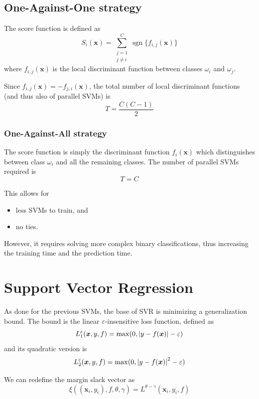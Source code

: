 \documentclass[oneside,onecolumn]{report}
\newcommand{\eps}{\varepsilon}
\DeclareMathOperator*{\sgn}{sgn}
\begin{document}
\subsection{One-Against-One strategy}
The score function is defined as
$$ S_i(\bm x) = \sum_{\substack{j = 1 \\ j \neq i}}^C \sgn\{f_{i, j}(\bm x)\} $$
where $f_{i, j}(\bm x)$ is the local discriminant function between classes $\omega_i$ and $\omega_j$.

Since $f_{i, j}(\bm x) = -f_{j, i}(\bm x)$, the total number of local discriminant functions (and thus also of parallel SVMs) is
$$ T = \frac{C (C - 1)}{2} $$

\subsubsection{One-Against-All strategy}
The score function is simply the discriminant function $f_i(\bm x)$ which distinguishes between class $\omega_i$ and all the remaining classes.
The number of parallel SVMs required is
$$ T = C $$

This allows for
\begin{itemize}
    \item less SVMs to train, and
    \item no ties.
\end{itemize}

However, it requires solving more complex binary classifications, thus increasing the training time and the prediction time.


\section{Support Vector Regression}
As done for the previous SVMs, the base of SVR is minimizing a generalization bound.
The bound is the linear $\eps$-insensitive loss function, defined as
$$ L_1^\eps(\bm x, y, f) = \max(0, \abs{y - f(\bm x)} - \eps) $$
and its quadratic version is
$$ L_2^\eps(\bm x, y, f) = \max(0, \abs{y - f(\bm x)}^2 - \eps) $$

We can redefine the margin slack vector as
$$ \xi((\bm x_i, y_i), f, \theta, \gamma) = L^{\theta - \gamma}(\bm x_i, y_i, f) $$
\end{document}

